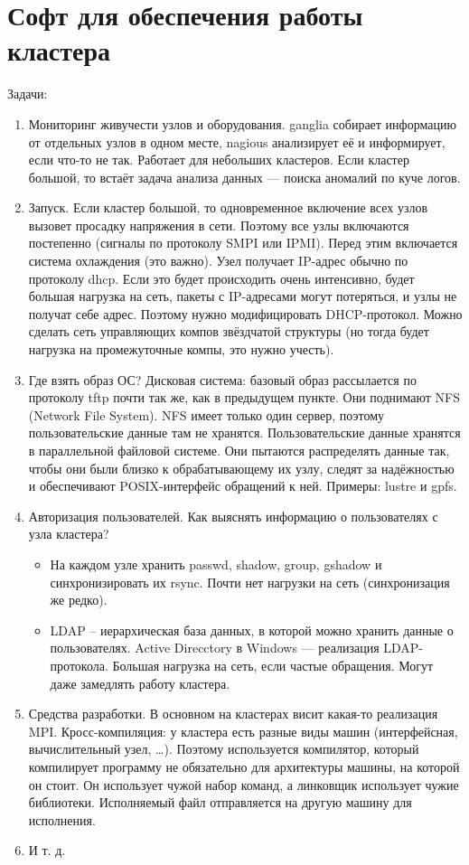 \section{Софт для обеспечения работы кластера}
Задачи:
\begin{enumerate}
 \item Мониторинг живучести узлов и оборудования.
  ganglia собирает информацию от отдельных узлов  в одном месте, nagious анализирует её и информирует, если что-то не так. Работает для небольших кластеров.
  Если кластер большой, то встаёт задача анализа данных --- поиска аномалий по куче логов. 
 \item Запуск. 
  Если кластер большой, то одновременное включение всех узлов вызовет просадку напряжения в сети. Поэтому все узлы включаются постепенно (сигналы по протоколу SMPI или IPMI).
  Перед этим включается система охлаждения (это важно). 
  Узел получает IP-адрес обычно по протоколу dhcp. Если это будет происходить очень интенсивно, будет большая нагрузка на сеть, пакеты с IP-адресами могут потеряться, и узлы не получат себе адрес. Поэтому нужно модифицировать DHCP-протокол. Можно сделать сеть управляющих компов звёздчатой структуры (но тогда будет нагрузка на промежуточные компы, это нужно учесть).
 \item Где взять образ ОС?
  Дисковая система: базовый образ рассылается по протоколу tftp почти так же, как в предыдущем пункте. Они поднимают NFS (Network File System). NFS имеет только один сервер, поэтому пользовательские данные там не хранятся. 
  Пользовательские данные хранятся в параллельной файловой системе. Они пытаются распределять данные так, чтобы они были близко к обрабатывающему их узлу, следят за надёжностью и обеспечивают POSIX-интерфейс обращений к ней. Примеры: lustre и gpfs.
 \item Авторизация пользователей.
  Как выяснять информацию о пользователях с узла кластера?
  \begin{itemize}
   \item На каждом узле хранить passwd, shadow, group, gshadow и синхронизировать их rsync. Почти нет нагрузки на сеть (синхронизация же редко).
   \item LDAP -- иерархическая база данных, в которой можно хранить данные о пользователях. Active Direcctory в Windows --- реализация LDAP-протокола. Большая нагрузка на сеть, если частые обращения. Могут даже замедлять работу кластера.
  \end{itemize}
  \item Средства разработки. В основном на кластерах висит какая-то реализация MPI.
  Кросс-компиляция: у кластера есть разные виды машин (интерфейсная, вычислительный узел, \dots). Поэтому используется компилятор, который компилирует программу не обязательно для архитектуры машины, на которой он стоит. Он использует чужой набор команд, а линковщик использует чужие библиотеки. Исполняемый файл отправляется на другую машину для исполнения. 
  \item И т. д. 
\end{enumerate}

